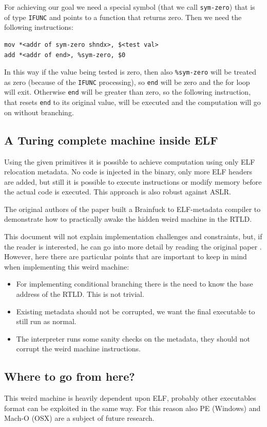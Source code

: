 \documentclass[11pt,twoside,a4paper]{article}
\begin{document}
For achieving our goal we need a special symbol (that we call \texttt{sym-zero}) that is of type \texttt{IFUNC} and points to a function that returns zero. Then we need the following instructions:
\begin{lstlisting}
mov *<addr of sym-zero shndx>, $<test val>
add *<addr of end>, %sym-zero, $0
\end{lstlisting}

In this way if the value being tested is zero, then also \texttt{\%sym-zero} will be treated as zero (because of the \texttt{IFUNC} processing), so \texttt{end} will be zero and the for loop will exit. Otherwise \texttt{end} will be greater than zero, so the following instruction, that resets \texttt{end} to its original value, will be executed and the computation will go on without branching.


\subsection{A Turing complete machine inside ELF}

Using the given primitives it is possible to achieve computation using only ELF relocation metadata. No code is injected in the binary, only more ELF headers are added, but still it is possible to execute instructions or modify memory before the actual code is executed. This approach is also robust against ASLR.

The original authors of the paper built a Brainfuck to ELF-metadata compiler to demonstrate how to practically awake the hidden weird machine in the RTLD.

This document will not explain implementation challenges and constraints, but, if the reader is interested, he can go into more detail by reading the original paper \cite{elf_machine}. However, here there are particular points that are important to keep in mind when implementing this weird machine:
\begin{itemize}
\item For implementing conditional branching there is the need to know the base address of the RTLD. This is not trivial.
\item Existing metadata should not be corrupted, we want the final executable to still run as normal.
\item The interpreter runs some sanity checks on the metadata, they should not corrupt the weird machine instructions.
\end{itemize}


\subsection{Where to go from here?}
This weird machine is heavily dependent upon ELF, probably other executables format can be exploited in the same way. For this reason also PE (Windows) and Mach-O (OSX) are a subject of future research.
\end{document}
